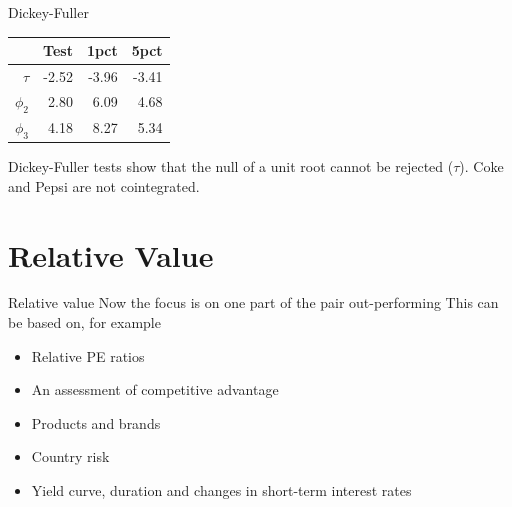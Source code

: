 \documentclass[14pt,xcolor=pdftex,dvipsnames,table]{beamer}\usepackage[]{graphicx}\usepackage[]{color}
\begin{document}
\begin{frame}{Dickey-Fuller}
\begin{table}[ht]
\centering
\begin{tabular}{rrrr}
  \hline
   & Test & 1pct& 5pct  \\ 
  \hline
$\tau$ & -2.52 & -3.96 & -3.41\\
 $\phi_2$ & 2.80 & 6.09 & 4.68\\ 
$\phi_3$ & 4.18 & 8.27 & 5.34\\ 
   \hline
\end{tabular}
\end{table}
Dickey-Fuller tests  show that the null of a unit root cannot be rejected ($\tau$).  Coke and Pepsi are not cointegrated. 
\end{frame}

\section{Relative Value}
\begin{frame}{Relative value}
Now the focus is on one part of the pair out-performing
This can be based on, for example
\begin{itemize}[<+-| alert@+>]
\item Relative PE ratios
\item An assessment of competitive advantage
\item Products and brands
\item Country risk
\item Yield curve, duration and changes in short-term interest rates
\end{itemize}

\end{frame}
\end{document}
